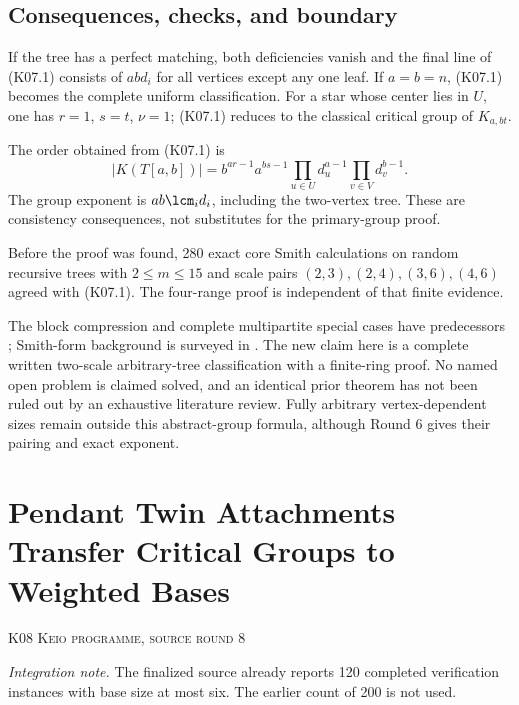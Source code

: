 \documentclass[11pt,a4paper]{article}
\theoremstyle{definition}\newtheorem{definition}[theorem]{Definition}
\theoremstyle{remark}\newtheorem{remark}[theorem]{Remark}
\numberwithin{equation}{section}
\begin{document}
\subsection{Consequences, checks, and boundary}\label{K07-sec-6}
If the tree has a perfect matching, both deficiencies vanish and the final line of (K07.1) consists of $ab d_i$ for all vertices except any one leaf. If $a=b=n$, (K07.1) becomes the complete uniform classification. For a star whose center lies in $U$, one has $r=1$, $s=t$, $\nu=1$; (K07.1) reduces to the classical critical group of $K_{a,bt}$.

The order obtained from (K07.1) is
\[
 |K(T[a,b])|=b^{ar-1}a^{bs-1}
       \prod_{u\in U}d_u^{a-1}\prod_{v\in V}d_v^{b-1}.       \tag{K07.9}
\]
The group exponent is $ab\lcm_i d_i$, including the two-vertex tree. These are consistency consequences, not substitutes for the primary-group proof.

Before the proof was found, 280 exact core Smith calculations on random recursive trees with $2\leq m\leq15$ and scale pairs $(2,3),(2,4),(3,6),(4,6)$ agreed with (K07.1). The four-range proof is independent of that finite evidence.

The block compression and complete multipartite special cases have predecessors \cite{ref028,ref032}; Smith-form background is surveyed in \cite{ref030}. The new claim here is a complete written two-scale arbitrary-tree classification with a finite-ring proof. No named open problem is claimed solved, and an identical prior theorem has not been ruled out by an exhaustive literature review. Fully arbitrary vertex-dependent sizes remain outside this abstract-group formula, although Round 6 gives their pairing and exact exponent.




\clearpage
\section[K08 --- Pendant Twin Attachments Transfer Critical Groups to Weighted Bases]{Pendant Twin Attachments Transfer Critical Groups to Weighted Bases}\label{contrib-K08}
\noindent\textsc{K08 \quad Keio programme, source round 8}\par\medskip
\noindent\textit{Integration note.} The finalized source already reports 120 completed verification instances with base size at most six. The earlier count of 200 is not used.\par\medskip
\end{document}
